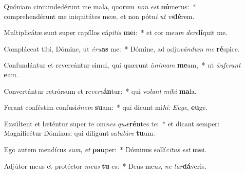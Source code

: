 \item Quóniam circumdedérunt me mala, quorum \textit{non} \textit{est} \textbf{nú}merus:~* comprehendérunt me iniquitátes meæ, et non pótu\textit{i} \textit{ut} \textit{vi}\textbf{dé}rem.
\item Multiplicátæ sunt super capíllos cá\textit{pi}\textit{tis} \textbf{me}i:~* et cor me\textit{um} \textit{de}\textit{re}\textbf{lí}quit me.
\item Compláceat tibi, Dómine, ut \textit{é}\textit{ru}\textbf{as} me:~* Dómine, ad adju\textit{ván}\textit{dum} \textit{me} \textbf{ré}spice.
\item Confundántur et revereántur simul, qui quærunt á\textit{ni}\textit{mam} \textbf{me}am,~* ut \textit{áu}\textit{fe}\textit{rant} \textbf{e}am.
\item Convertántur retrórsum et re\textit{ve}\textit{re}\textbf{án}tur:~* qui vo\textit{lunt} \textit{mi}\textit{hi} \textbf{ma}la.
\item Ferant conféstim confusi\textit{ó}\textit{nem} \textbf{su}am:~* qui dicunt mi\textit{hi}: \textit{Eu}\textit{ge}, \textbf{eu}ge.
\item Exsúltent et læténtur super te om\textit{nes} \textit{quæ}\textbf{rén}tes te:~* et dicant semper: Magnificétur Dóminus: qui díligunt sa\textit{lu}\textit{tá}\textit{re} \textbf{tu}um.
\item Ego autem mendícus \textit{sum}, \textit{et} \textbf{pau}per:~* Dóminus sollí\textit{ci}\textit{tus} \textit{est} \textbf{me}i.
\item Adjútor meus et protéctor \textit{me}\textit{us} \textbf{tu} es:~* Deus me\textit{us}, \textit{ne} \textit{tar}\textbf{dá}veris.
